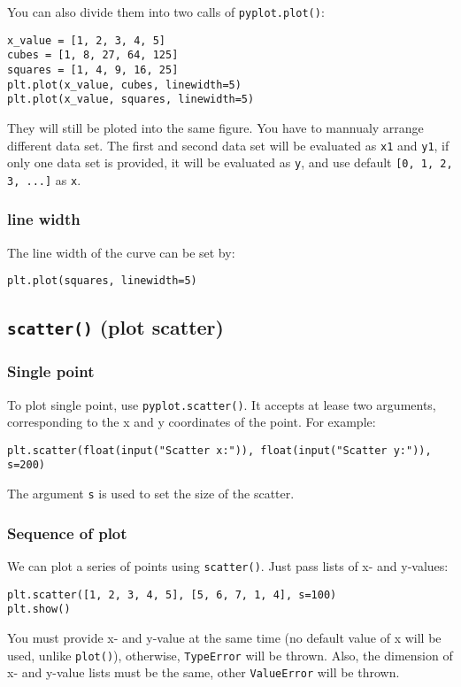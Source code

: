 \documentclass[12pt]{book}
\begin{document}
You can also divide them into two calls of \texttt{pyplot.plot()}:
\begin{verbatim}
x_value = [1, 2, 3, 4, 5]
cubes = [1, 8, 27, 64, 125]
squares = [1, 4, 9, 16, 25]
plt.plot(x_value, cubes, linewidth=5)
plt.plot(x_value, squares, linewidth=5)
\end{verbatim}
They will still be ploted into the same figure. You have to mannualy arrange different data set. The first and second data set will be evaluated as \texttt{x1} and \texttt{y1}, if only one data set is provided, it will be evaluated as \texttt{y}, and use default \texttt{[0, 1, 2, 3, ...]} as \texttt{x}.
\subsubsection{line width}
\label{sec:orgb28ffca}
The line width of the curve can be set by:
\begin{verbatim}
plt.plot(squares, linewidth=5)
\end{verbatim}

\subsection{\texttt{scatter()} (plot scatter)}
\label{sec:org8764ffb}
\subsubsection{Single point}
\label{sec:org4889ef7}
To plot single point, use \texttt{pyplot.scatter()}. It accepts at lease two arguments, corresponding to the x and y coordinates of the point. For example:
\begin{verbatim}
plt.scatter(float(input("Scatter x:")), float(input("Scatter y:")), s=200)
\end{verbatim}
The argument \texttt{s} is used to set the size of the scatter.
\subsubsection{Sequence of plot}
\label{sec:org2b2bd73}
We can plot a series of points using \texttt{scatter()}. Just pass lists of x- and y-values:
\begin{verbatim}
plt.scatter([1, 2, 3, 4, 5], [5, 6, 7, 1, 4], s=100)
plt.show()
\end{verbatim}
You must provide x- and y-value at the same time (no default value of x will be used, unlike \texttt{plot()}), otherwise, \texttt{TypeError} will be thrown. Also, the dimension of x- and y-value lists must be the same, other \texttt{ValueError} will be thrown.
\end{document}
